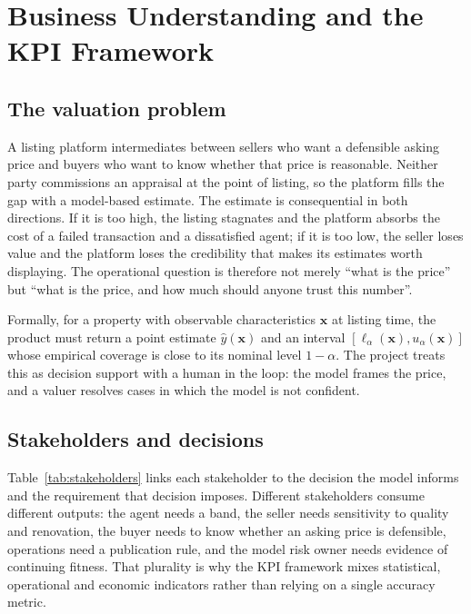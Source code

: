 \section{Business Understanding and the KPI Framework}
\label{sec:business}

\subsection{The valuation problem}

A listing platform intermediates between sellers who want a defensible asking price
and buyers who want to know whether that price is reasonable. Neither party
commissions an appraisal at the point of listing, so the platform fills the gap with
a model-based estimate. The estimate is consequential in both directions. If it is
too high, the listing stagnates and the platform absorbs the cost of a failed
transaction and a dissatisfied agent; if it is too low, the seller loses value and
the platform loses the credibility that makes its estimates worth displaying. The
operational question is therefore not merely ``what is the price'' but ``what is the
price, and how much should anyone trust this number''.

Formally, for a property with observable characteristics $\mathbf{x}$ at listing
time, the product must return a point estimate $\hat{y}(\mathbf{x})$ and an interval
$[\ell_\alpha(\mathbf{x}), u_\alpha(\mathbf{x})]$ whose empirical coverage is close to
its nominal level $1-\alpha$. The project treats this as decision support with a
human in the loop: the model frames the price, and a valuer resolves cases in which
the model is not confident.

\subsection{Stakeholders and decisions}

Table~\ref{tab:stakeholders} links each stakeholder to the decision the model
informs and the requirement that decision imposes. Different stakeholders consume
different outputs: the agent needs a band, the seller needs sensitivity to quality and
renovation, the buyer needs to know whether an asking price is defensible, operations
need a publication rule, and the model risk owner needs evidence of continuing
fitness. That plurality is why the KPI framework mixes statistical, operational and
economic indicators rather than relying on a single accuracy metric.

